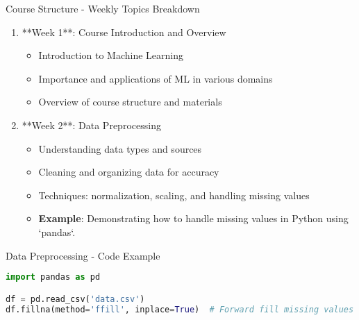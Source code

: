 \documentclass[aspectratio=169]{beamer}
\begin{document}
\begin{frame}[fragile]{Course Structure - Weekly Topics Breakdown}
    \begin{enumerate}
        \item **Week 1**: Course Introduction and Overview
        \begin{itemize}
            \item Introduction to Machine Learning
            \item Importance and applications of ML in various domains
            \item Overview of course structure and materials
        \end{itemize}
        \item **Week 2**: Data Preprocessing
        \begin{itemize}
            \item Understanding data types and sources
            \item Cleaning and organizing data for accuracy
            \item Techniques: normalization, scaling, and handling missing values
            \item \textbf{Example}: Demonstrating how to handle missing values in Python using `pandas`.
        \end{itemize}
    \end{enumerate}
\end{frame}

\begin{frame}[fragile]{Data Preprocessing - Code Example}
    \begin{lstlisting}[language=Python]
import pandas as pd

df = pd.read_csv('data.csv')
df.fillna(method='ffill', inplace=True)  # Forward fill missing values
    \end{lstlisting}
\end{frame}
\end{document}
